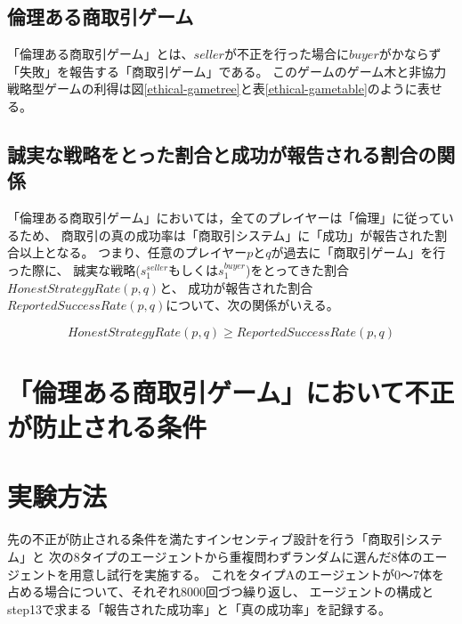 \subsection{倫理ある商取引ゲーム}
「倫理ある商取引ゲーム」とは、$seller$が不正を行った場合に$buyer$がかならず「失敗」を報告する「商取引ゲーム」である。
このゲームのゲーム木と非協力戦略型ゲームの利得は図\ref{ethical-gametree}と表\ref{ethical-gametable}のように表せる。

\subsection{誠実な戦略をとった割合と成功が報告される割合の関係}
「倫理ある商取引ゲーム」においては，全てのプレイヤーは「倫理」に従っているため、
商取引の真の成功率は「商取引システム」に「成功」が報告された割合以上となる。
つまり、任意のプレイヤー$p$と$q$が過去に「商取引ゲーム」を行った際に、
誠実な戦略($s^{seller}_1$もしくは$s^{buyer}_1$)をとってきた割合$HonestStrategyRate(p, q)$と、
成功が報告された割合$ReportedSuccessRate(p, q)$について、次の関係がいえる。

\begin{equation}
  HonestStrategyRate(p, q) \geq ReportedSuccessRate(p, q)
\end{equation}

\section{「倫理ある商取引ゲーム」において不正が防止される条件}


\section{実験方法}
先の不正が防止される条件を満たすインセンティブ設計を行う「商取引システム」と
次の8タイプのエージェントから重複問わずランダムに選んだ8体のエージェントを用意し試行を実施する。
これをタイプAのエージェントが0〜7体を占める場合について、それぞれ8000回づつ繰り返し、
エージェントの構成とstep13で求まる「報告された成功率」と「真の成功率」を記録する。


